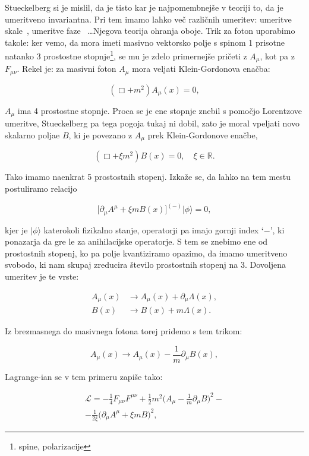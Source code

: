 \documentclass[a4paper, twocolumn, titlepage]{article}
\begin{document}
Stueckelberg si je mislil, da je tisto kar je najpomembnej\v se v teoriji to, da je umeritveno invariantna. Pri tem imamo
lahko ve\v c razli\v cnih umeritev: umeritve skale~\cite{stueckelberg,nieto2}, umeritve faze~\cite{nieto2} \ldots Njegova teorija ohranja
oboje. Trik za foton
uporabimo takole: ker vemo, da mora imeti masivno vektorsko polje s spinom 1 prisotne natanko 3 prostostne
stopnje\footnote{spine, polarizacije}, se mu je zdelo primernej\v se pri\v ceti z $A_\mu$, kot pa z $F_{\mu\nu}$.
Rekel je: za masivni foton $A_\mu$ mora veljati Klein-Gordonova enačba:

\[
	(\Box + m^2)A_\mu (x) = 0,
\]

$A_\mu$ ima
4 prostostne stopnje. Proca se je ene stopnje znebil s pomo\v cjo Lorentzove umeritve, Stueckelberg pa tega pogoja tukaj ni dobil, zato je
moral vpeljati novo skalarno poljae $B$, ki je povezano z $A_\mu$ prek Klein-Gordonove enačbe,

\[
	(\Box + \xi m^2)B (x) = 0, \quad \xi \in \mathbb{R}.
\]

Tako imamo naenkrat 5 prostostnih stopenj. Izka\v ze se, da lahko na
tem mestu postuliramo relacijo

\[
	\big[\partial_\mu A^\mu + \xi mB(x)\big]^{(-)}|\phi\rangle = 0,
\]

kjer je $|\phi\rangle$ katerokoli fizikalno stanje, operatorji pa imajo gornji index `$-$', ki ponazarja da gre le za
anihilacijske operatorje. S tem se znebimo ene od prostostnih stopenj, ko pa polje kvantiziramo opazimo, da imamo
umeritveno svobodo, ki nam skupaj zreducira \v stevilo prostostnih stopenj na 3. Dovoljena umeritev je te vrste:

\begin{align*}
	A_\mu (x) &\to A_\mu (x) + \partial_\mu \Lambda (x), \\
	B (x) &\to B (x) + m\Lambda(x).
\end{align*}

Iz brezmasnega do masivnega fotona torej pridemo s tem trikom:

\begin{equation}
	A_\mu (x) \to A_\mu (x) - \frac{1}{m}\partial_\mu B(x),
\end{equation}

Lagrange-ian se v tem primeru zapi\v se tako:

\begin{multline}
	\mathcal{L} = -\frac{1}{4}F_{\mu\nu}F^{\mu\nu} + \frac{1}{2}m^2\Big(A_\mu - \frac{1}{m}\partial_\mu B\Big)^2 -\\-
		\frac{1}{2\xi}\big(\partial_\mu A^\mu + \xi mB\big)^2,
\end{multline}
\end{document}
